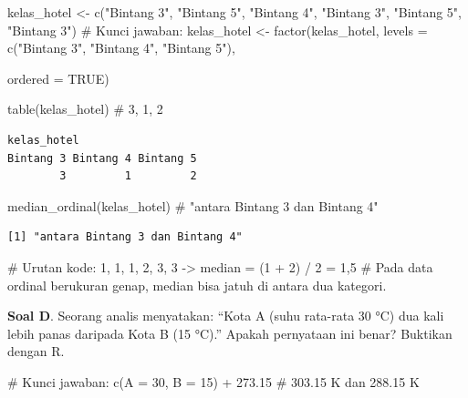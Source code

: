 \documentclass[
  indonesian,
  letterpaper,
]{book}
\newenvironment{Shaded}{\begin{snugshade}}{\end{snugshade}}
\newcommand{\AttributeTok}[1]{\textcolor[rgb]{0.40,0.45,0.13}{#1}}
\newcommand{\CommentTok}[1]{\textcolor[rgb]{0.37,0.37,0.37}{#1}}
\newcommand{\ConstantTok}[1]{\textcolor[rgb]{0.56,0.35,0.01}{#1}}
\newcommand{\DecValTok}[1]{\textcolor[rgb]{0.68,0.00,0.00}{#1}}
\newcommand{\FloatTok}[1]{\textcolor[rgb]{0.68,0.00,0.00}{#1}}
\newcommand{\FunctionTok}[1]{\textcolor[rgb]{0.28,0.35,0.67}{#1}}
\newcommand{\NormalTok}[1]{\textcolor[rgb]{0.00,0.23,0.31}{#1}}
\newcommand{\OtherTok}[1]{\textcolor[rgb]{0.00,0.23,0.31}{#1}}
\newcommand{\SpecialCharTok}[1]{\textcolor[rgb]{0.37,0.37,0.37}{#1}}
\newcommand{\StringTok}[1]{\textcolor[rgb]{0.13,0.47,0.30}{#1}}
\begin{document}
\begin{Shaded}
\begin{Highlighting}[]
\NormalTok{kelas\_hotel }\OtherTok{\textless{}{-}} \FunctionTok{c}\NormalTok{(}\StringTok{"Bintang 3"}\NormalTok{, }\StringTok{"Bintang 5"}\NormalTok{, }\StringTok{"Bintang 4"}\NormalTok{, }\StringTok{"Bintang 3"}\NormalTok{, }\StringTok{"Bintang 5"}\NormalTok{, }\StringTok{"Bintang 3"}\NormalTok{)}
\CommentTok{\# Kunci jawaban:}
\NormalTok{kelas\_hotel }\OtherTok{\textless{}{-}} \FunctionTok{factor}\NormalTok{(kelas\_hotel, }\AttributeTok{levels =} \FunctionTok{c}\NormalTok{(}\StringTok{"Bintang 3"}\NormalTok{, }\StringTok{"Bintang 4"}\NormalTok{, }\StringTok{"Bintang 5"}\NormalTok{),}

\AttributeTok{ordered =} \ConstantTok{TRUE}\NormalTok{)}

\FunctionTok{table}\NormalTok{(kelas\_hotel) }\CommentTok{\# 3, 1, 2}
\end{Highlighting}
\end{Shaded}

\begin{verbatim}
kelas_hotel
Bintang 3 Bintang 4 Bintang 5 
        3         1         2 
\end{verbatim}

\begin{Shaded}
\begin{Highlighting}[]
\FunctionTok{median\_ordinal}\NormalTok{(kelas\_hotel) }\CommentTok{\# "antara Bintang 3 dan Bintang 4"}
\end{Highlighting}
\end{Shaded}

\begin{verbatim}
[1] "antara Bintang 3 dan Bintang 4"
\end{verbatim}

\begin{Shaded}
\begin{Highlighting}[]
\CommentTok{\# Urutan kode: 1, 1, 1, 2, 3, 3 {-}\textgreater{} median = (1 + 2) / 2 = 1,5}
\CommentTok{\# Pada data ordinal berukuran genap, median bisa jatuh di antara dua kategori.}
\end{Highlighting}
\end{Shaded}

\textbf{Soal D}. Seorang analis menyatakan: ``Kota A (suhu rata-rata 30
°C) dua kali lebih panas daripada Kota B (15 °C).'' Apakah pernyataan
ini benar? Buktikan dengan R.

\begin{Shaded}
\begin{Highlighting}[]
\CommentTok{\# Kunci jawaban:}
\FunctionTok{c}\NormalTok{(}\AttributeTok{A =} \DecValTok{30}\NormalTok{, }\AttributeTok{B =} \DecValTok{15}\NormalTok{) }\SpecialCharTok{+} \FloatTok{273.15} \CommentTok{\# 303.15 K dan 288.15 K}
\end{Highlighting}
\end{Shaded}
\end{document}

